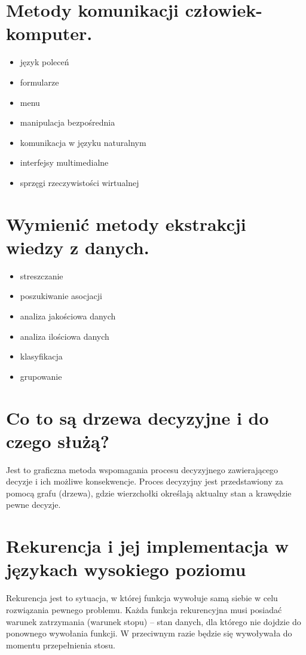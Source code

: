 \documentclass[12pt,a4paper]{article}
\begin{document}
	\section{Metody komunikacji człowiek-komputer.}
	\begin{itemize}
		\item język poleceń
		\item formularze
		\item menu
		\item manipulacja bezpośrednia
		\item komunikacja w języku naturalnym
		\item interfejsy multimedialne
		\item sprzęgi rzeczywistości wirtualnej
	\end{itemize}

	\section{Wymienić metody ekstrakcji wiedzy z danych.}
	\begin{itemize}
		\item streszczanie
		\item poszukiwanie asocjacji
		\item analiza jakościowa danych
		\item analiza ilościowa danych
		\item klasyfikacja
		\item grupowanie
	\end{itemize}

	\section{Co to są drzewa decyzyjne i do czego służą?}
	Jest to graficzna metoda wspomagania procesu decyzyjnego zawierającego decyzje i ich możliwe konsekwencje. Proces decyzyjny jest przedstawiony za pomocą grafu (drzewa), gdzie wierzchołki określają aktualny stan a krawędzie pewne decyzje.

	\section{Rekurencja i jej implementacja w językach wysokiego poziomu}
	Rekurencja jest to sytuacja, w której funkcja wywołuje samą siebie w celu rozwiązania pewnego problemu. Każda funkcja rekurencyjna musi posiadać warunek zatrzymania (warunek stopu) – stan danych, dla którego nie dojdzie do ponownego wywołania funkcji. W przeciwnym razie będzie się wywoływała do momentu przepełnienia stosu.
\end{document}

